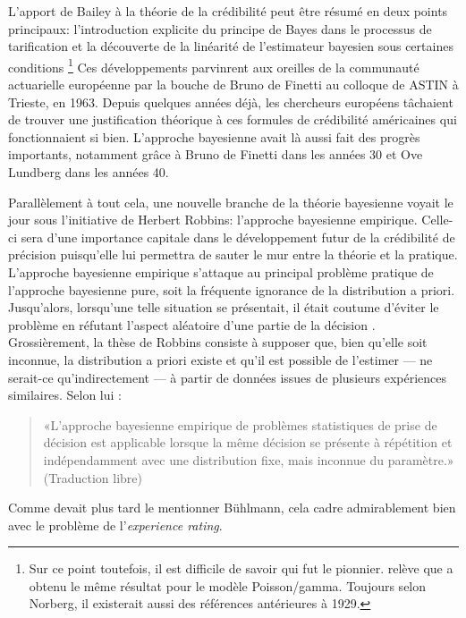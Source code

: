 L'apport de Bailey à la théorie de la crédibilité peut être résumé en
deux points principaux: l'introduction explicite du principe de Bayes
dans le processus de tarification et la découverte de la linéarité de
l'estimateur bayesien sous certaines conditions%
\footnote{Sur ce point toutefois, il est difficile de savoir qui fut
  le pionnier. \cite{Norberg:credibility:1979} relève que
  \cite{Keffer:1929} a obtenu le même résultat pour le modèle
  Poisson/gamma. Toujours selon Norberg, il existerait aussi des
  références antérieures à 1929.} %
Ces développements parvinrent aux oreilles de la communauté
actuarielle européenne par la bouche de Bruno de Finetti au colloque
de ASTIN à Trieste, en 1963. Depuis quelques années déjà, les
chercheurs européens tâchaient de trouver une justification théorique
à ces formules de crédibilité américaines qui fonctionnaient si bien.
L'approche bayesienne avait là aussi fait des progrès importants,
notamment grâce à Bruno de Finetti dans les années 30 et Ove Lundberg
dans les années 40.

Parallèlement à tout cela, une nouvelle branche de la théorie
bayesienne voyait le jour sous l'initiative de Herbert Robbins:
l'approche bayesienne empirique. Celle-ci sera d'une importance
capitale dans le développement futur de la crédibilité de précision
puisqu'elle lui permettra de sauter le mur entre la théorie et la
pratique. L'approche bayesienne empirique
\citep{Robbins:empiricalbayes:1955,Robbins:empiricalbayes:1964}
s'attaque au principal problème pratique de l'approche bayesienne
pure, soit la fréquente ignorance de la distribution a priori.
Jusqu'alors, lorsqu'une telle situation se présentait, il était
coutume d'éviter le problème en réfutant l'aspect aléatoire d'une
partie de la décision \citep{Neyman:1962}. Grossièrement, la thèse de
Robbins consiste à supposer que, bien qu'elle soit inconnue, la
distribution a priori existe et qu'il est possible de l'estimer --- ne
serait-ce qu'indirectement --- à partir de données issues de plusieurs
expériences similaires. Selon lui \citep{Robbins:empiricalbayes:1964}:
\begin{quote}
  «L'approche bayesienne empirique de problèmes statistiques de prise
  de décision est applicable lorsque la même décision se présente à
  répétition et indépendamment avec une distribution fixe, mais
  inconnue du paramètre.» (Traduction libre)
\end{quote}

Comme devait plus tard le mentionner Bühlmann, cela cadre
admirablement bien avec le problème de l'\emph{experience rating}.

